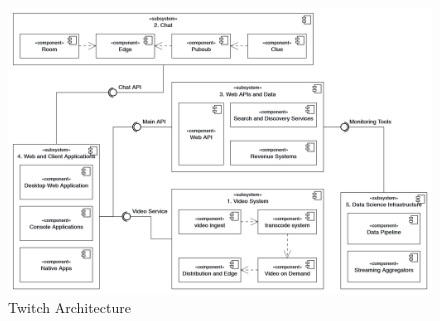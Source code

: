 \begin{figure}[htpb]
    \centering
    \includegraphics[width=\linewidth]{images/TwitchArchitecture.png}
    \caption[Twitch Architecture]{Twitch Architecture}\label{fig:twitch-architecture}
\end{figure}

